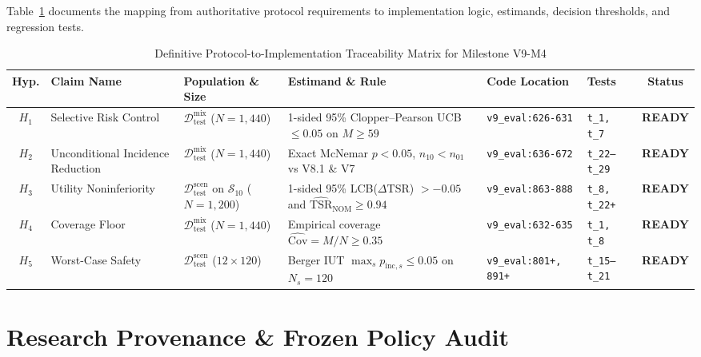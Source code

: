 \documentclass[10pt,a4paper]{article}
\begin{document}
Table~\ref{tab:traceability} documents the mapping from authoritative protocol requirements to implementation logic, estimands, decision thresholds, and regression tests.

\begin{table}[htbp]
\centering
\small
\caption{Definitive Protocol-to-Implementation Traceability Matrix for Milestone V9-M4}
\label{tab:traceability}
\begin{tabularx}{\textwidth}{clp{3.2cm}Xllc}
\toprule
\textbf{Hyp.} & \textbf{Claim Name} & \textbf{Population \& Size} & \textbf{Estimand \& Rule} & \textbf{Code Location} & \textbf{Tests} & \textbf{Status} \\
\midrule
\textbf{$H_1$} & Selective Risk Control & $\mathcal{D}_{\text{test}}^{\text{mix}}$ ($N=1,440$) & 1-sided 95\% Clopper--Pearson UCB $\le 0.05$ on $M \ge 59$ & \texttt{v9\_eval:626-631} & \texttt{t\_1, t\_7} & \textbf{READY} \\
\textbf{$H_2$} & Unconditional Incidence Reduction & $\mathcal{D}_{\text{test}}^{\text{mix}}$ ($N=1,440$) & Exact McNemar $p < 0.05$, $n_{10} < n_{01}$ vs V8.1 \& V7 & \texttt{v9\_eval:636-672} & \texttt{t\_22--t\_29} & \textbf{READY} \\
\textbf{$H_3$} & Utility Noninferiority & $\mathcal{D}_{\text{test}}^{\text{scen}}$ on $\mathcal{S}_{10}$ ($N=1,200$) & 1-sided 95\% LCB($\Delta\text{TSR}$) $> -0.05$ and $\widehat{\text{TSR}}_{\text{NOM}} \ge 0.94$ & \texttt{v9\_eval:863-888} & \texttt{t\_8, t\_22+} & \textbf{READY} \\
\textbf{$H_4$} & Coverage Floor & $\mathcal{D}_{\text{test}}^{\text{mix}}$ ($N=1,440$) & Empirical coverage $\widehat{\text{Cov}} = M / N \ge 0.35$ & \texttt{v9\_eval:632-635} & \texttt{t\_1, t\_8} & \textbf{READY} \\
\textbf{$H_5$} & Worst-Case Safety & $\mathcal{D}_{\text{test}}^{\text{scen}}$ ($12 \times 120$) & Berger IUT $\max_s p_{\mathrm{inc}, s} \le 0.05$ on $N_s = 120$ & \texttt{v9\_eval:801+, 891+} & \texttt{t\_15--t\_21} & \textbf{READY} \\
\bottomrule
\end{tabularx}
\end{table}

\section{Research Provenance \& Frozen Policy Audit}
\end{document}
